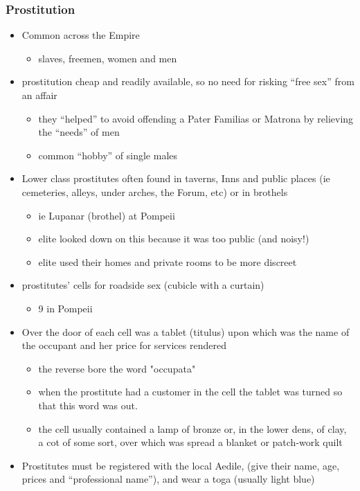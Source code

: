 \documentclass[12pt, twoside]{article}
\begin{document}
\subsubsection{Prostitution}
\begin{itemize}
\item Common across the Empire
	\begin{itemize}
	\item slaves, freemen, women and men
	\end{itemize}
\item prostitution cheap and readily available, so no need for risking “free sex” from an affair
	\begin{itemize}
	\item they “helped” to avoid offending a Pater Familias or Matrona by relieving the “needs” of men
	\item common “hobby” of single males
	\end{itemize}
\item Lower class prostitutes often found in taverns, Inns and public places (ie cemeteries, alleys, under arches, the Forum, etc) or in  brothels 
	\begin{itemize}
	\item ie Lupanar (brothel) at Pompeii
	\item elite looked down on this because it was too public (and noisy!) 
	\item elite used their homes and private rooms to be more discreet
	\end{itemize}
\item prostitutes’ cells for roadside sex (cubicle with a curtain)
	\begin{itemize}
	\item 9 in Pompeii
	\end{itemize}
\item Over the door of each cell was a tablet (titulus) upon which was the name of the occupant and her price for services rendered
	\begin{itemize}
	\item the reverse bore the word "occupata" 
	\item when the prostitute had a customer in the cell the tablet was turned so that this word was out.
	\item the cell usually contained a lamp of bronze or, in the lower dens, of clay, a cot of some sort, over which was spread a blanket or patch-work quilt
	\end{itemize}
\item Prostitutes must be registered with the local Aedile, (give their name, age, prices and “professional name”), and wear a toga (usually light blue)

\end{itemize}
\end{document}
